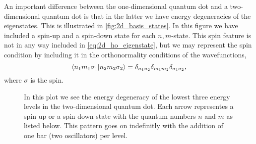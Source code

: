 An important difference between the one-dimensional quantum dot and a two-dimensional 
quantum dot is that in the latter we have energy degeneracies of the eigenstates.
This is illustrated in \autoref{fig:2d_basis_states}. In this figure we have included 
a spin-up and a spin-down state for each $n,m$-state. This spin feature is not in any way 
included in \autoref{eq:2d_ho_eigenstate}, but we may represent the spin condition by
including it in the orthonormality conditions of the wavefunctions,
\begin{equation}
    \braket{n_1m_1\sigma_1}{n_2m_2\sigma_2} 
    = \delta_{n_1n_2}\delta_{m_1m_2}\delta_{\sigma_1\sigma_2},
\end{equation}
where $\sigma$ is the spin.

\begin{figure}
    \begin{center}
    \end{center}
    \caption{In this plot we see the energy degeneracy of the
    lowest three energy levels in the two-dimensional quantum dot.
    Each arrow representes a spin up or a spin down state with the
    quantum numbers $n$ and $m$ as listed below. This pattern goes
    on indefinitly with the addition of one bar (two oscillators)
    per level.}
    \label{fig:2d_basis_states}
\end{figure}

